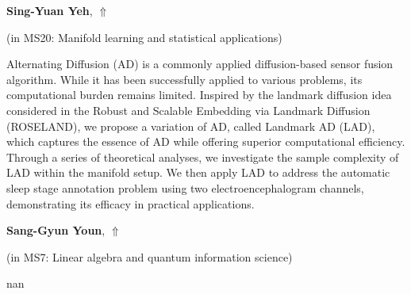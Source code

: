 \documentclass[ILAS2025-program.tex]{subfiles}
\begin{document}
\hypertarget{down0150}{}\begin{ilasabstract}
    
\textbf{Sing-Yuan Yeh},  \hfill \hyperlink{up0150}{$\Uparrow$}
    
    
(in {\color{mstitle}MS20: Manifold learning and statistical applications})
        
\mtskip
    Alternating Diffusion (AD) is a commonly applied diffusion-based sensor fusion algorithm. While it has been successfully applied to various problems, its computational burden remains limited. Inspired by the landmark diffusion idea considered in the Robust and Scalable Embedding via Landmark Diffusion (ROSELAND), we propose a variation of AD, called Landmark AD (LAD), which captures the essence of AD while offering superior computational efficiency. Through a series of theoretical analyses, we investigate the sample complexity of LAD within the manifold setup. We then apply LAD to address the automatic sleep stage annotation problem using two electroencephalogram channels, demonstrating its efficacy in practical applications.

\end{ilasabstract}
    

\hypertarget{down0362}{}\begin{ilasabstract}
    
\textbf{Sang-Gyun Youn},  \hfill \hyperlink{up0362}{$\Uparrow$}
    
    
(in {\color{mstitle}MS7: Linear algebra and quantum information science})
        
\mtskip
    nan
\end{ilasabstract}
    
\end{document}

